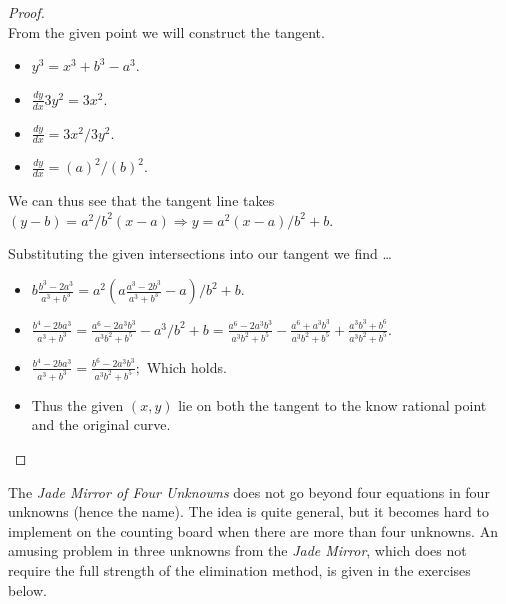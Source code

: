 \documentclass[12pt]{article}
\newcommand{\ds}{\displaystyle}
\theoremstyle{plain}
\begin{document}
\begin{proof}
  \ \\

  From the given point we will construct the tangent.

  \begin{itemize}
    \item $ \ds y^{3} = x^{3} + b^{3} - a^{3} $.
    \item $ \ds \frac{dy}{dx} 3y^{2} = 3x^{2} $.
    \item $ \ds \frac{dy}{dx} = 3x^{2} / 3y^{2} $.
    \item $ \ds \frac{dy}{dx} = (a)^{2} / (b)^{2} $.
  \end{itemize}

  We can thus see that the tangent line takes $ (y - b) = a^{2} / b^{2} (x - a) \Rightarrow y = a^{2}(x - a) / b^{2}  + b $.

  Substituting the given intersections into our tangent we find \dots

  \begin{itemize}
    \item $ \ds b\frac{b^{3} - 2a^{3}}{a^{3} + b^{3}} = a^{2}(a\frac{a^{3} - 2b^{3}}{a^{3} + b^{3}} - a) / b^{2}  + b $.
    \item $ \ds \frac{b^{4} - 2ba^{3}}{a^{3} + b^{3}} = \frac{a^{6} - 2a^{3}b^{3}}{a^{3}b^{2} + b^{5}} - a^{3}/b^{2} + b = \frac{a^{6} - 2a^{3}b^{3}}{a^{3}b^{2} + b^{5}} - \frac{a^{6} + a^{3}b^{3}}{a^{3}b^{2} + b^{5}} + \frac{a^{3}b^{3} + b^{6}}{a^{3}b^{2} + b^{5}} $.
    \item $ \ds \frac{b^{4} - 2ba^{3}}{a^{3} + b^{3}} = \frac{b^{6} - 2a^{3}b^{3}}{a^{3}b^{2} + b^{5}} ; $ Which holds.
    \item Thus the given $ (x, y) $ lie on both the tangent to the know rational point and the original curve.

  \end{itemize}

\end{proof}

\newpage

The \emph{Jade Mirror of Four Unknowns} does not go beyond four equations in four unknowns (hence the name). The idea is quite general, but it becomes hard to implement on the counting board when there are more than four unknowns. An amusing problem in three unknowns from the \emph{Jade Mirror}, which does not require the full strength of the elimination method, is given in the exercises below.

\end{document}
